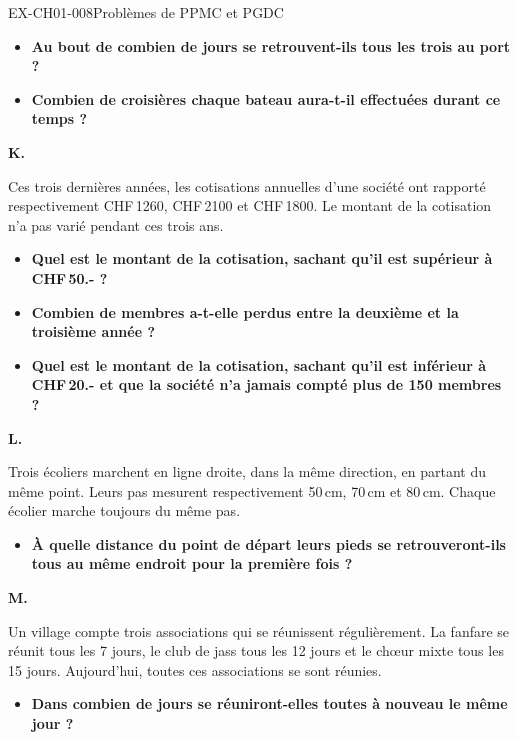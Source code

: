 \documentclass[12pt, a4paper]{article}
\begin{document}
\begin{exercice}{EX-CH01-008}{Problèmes de PPMC et PGDC}
\begin{itemize}[label=$\blacktriangleright$]
\item \textbf{Au bout de combien de jours se retrouvent-ils tous les trois au port ?}
\item \textbf{Combien de croisières chaque bateau aura-t-il effectuées durant ce temps ?}
\end{itemize}

\bigskip\textbf{K.}

\medskip
Ces trois dernières années, les cotisations annuelles d'une société ont rapporté respectivement CHF\,1260, CHF\,2100 et CHF\,1800.
Le montant de la cotisation n'a pas varié pendant ces trois ans.

\begin{itemize}[label=$\blacktriangleright$]
\item \textbf{Quel est le montant de la cotisation, sachant qu'il est supérieur à CHF\,50.- ?}
\item \textbf{Combien de membres a-t-elle perdus entre la deuxième et la troisième année ?}
\item \textbf{Quel est le montant de la cotisation, sachant qu'il est inférieur à CHF\,20.- et que la société n'a jamais compté plus de 150 membres ?}
\end{itemize}

\bigskip\textbf{L.}

\medskip
Trois écoliers marchent en ligne droite, dans la même direction, en partant du même point. Leurs pas mesurent respectivement 50\,cm, 70\,cm et 80\,cm. Chaque écolier marche toujours du même pas.

\begin{itemize}[label=$\blacktriangleright$]
\item \textbf{À quelle distance du point de départ leurs pieds se retrouveront-ils tous au même endroit pour la première fois ?}
\end{itemize}

\bigskip\textbf{M.}

\medskip
Un village compte trois associations qui se réunissent régulièrement. La fanfare se réunit tous les 7 jours, le club de jass tous les 12 jours et le chœur mixte tous les 15 jours. Aujourd'hui, toutes ces associations se sont réunies.

\begin{itemize}[label=$\blacktriangleright$]
\item \textbf{Dans combien de jours se réuniront-elles toutes à nouveau le même jour ?}
\end{itemize}


\end{exercice}
\end{document}
